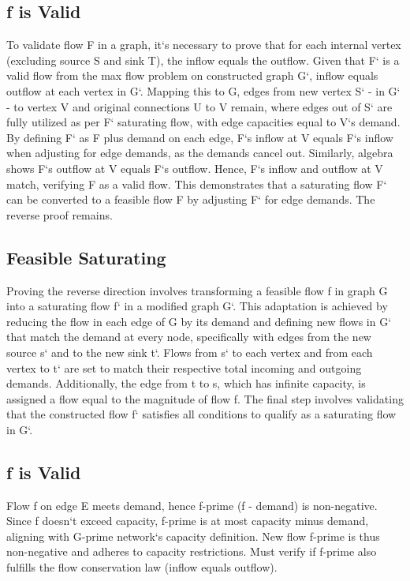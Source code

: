 \subsection*{f is Valid}
To validate flow F in a graph, it`s necessary to prove that for each internal vertex (excluding source S and sink T), the inflow equals the outflow.
Given that F` is a valid flow from the max flow problem on constructed graph G`, inflow equals outflow at each vertex in G`.
Mapping this to G, edges from new vertex S` - in G` - to vertex V and original connections U to V remain, where edges out of S` are fully utilized as per F` saturating flow, with edge capacities equal to V`s demand.
By defining F` as F plus demand on each edge, F`s inflow at V equals F`s inflow when adjusting for edge demands, as the demands cancel out.
Similarly, algebra shows F`s outflow at V equals F`s outflow.
Hence, F`s inflow and outflow at V match, verifying F as a valid flow.
This demonstrates that a saturating flow F` can be converted to a feasible flow F by adjusting F` for edge demands.
The reverse proof remains.

\subsection*{Feasible Saturating}
Proving the reverse direction involves transforming a feasible flow f in graph G into a saturating flow f` in a modified graph G`.
This adaptation is achieved by reducing the flow in each edge of G by its demand and defining new flows in G` that match the demand at every node, specifically with edges from the new source s` and to the new sink t`.
Flows from s` to each vertex and from each vertex to t` are set to match their respective total incoming and outgoing demands.
Additionally, the edge from t to s, which has infinite capacity, is assigned a flow equal to the magnitude of flow f.
The final step involves validating that the constructed flow f` satisfies all conditions to qualify as a saturating flow in G`.

\subsection*{f is Valid}
Flow f on edge E meets demand, hence f-prime (f - demand) is non-negative.
Since f doesn`t exceed capacity, f-prime is at most capacity minus demand, aligning with G-prime network`s capacity definition.
New flow f-prime is thus non-negative and adheres to capacity restrictions.
Must verify if f-prime also fulfills the flow conservation law (inflow equals outflow).

